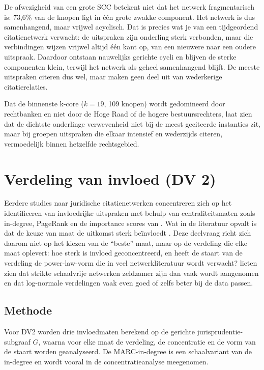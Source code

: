 \documentclass[a4paper, 12pt]{report}
\begin{document}
De afwezigheid van een grote SCC betekent niet dat het netwerk fragmentarisch is: 73,6\% van de knopen ligt in één grote zwakke component. Het netwerk is dus samenhangend, maar vrijwel acyclisch. Dat is precies wat je van een tijdgeordend citatienetwerk verwacht: de uitspraken zijn onderling sterk verbonden, maar die verbindingen wijzen vrijwel altijd één kant op, van een nieuwere naar een oudere uitspraak. Daardoor ontstaan nauwelijks gerichte cycli en blijven de sterke componenten klein, terwijl het netwerk als geheel samenhangend blijft. De meeste uitspraken citeren dus wel, maar maken geen deel uit van wederkerige citatierelaties.

Dat de binnenste k-core ($k = 19$, 109 knopen) wordt gedomineerd door rechtbanken en niet door de Hoge Raad of de hogere bestuursrechters, laat zien dat de dichtste onderlinge verwevenheid niet bij de meest geciteerde instanties zit, maar bij groepen uitspraken die elkaar intensief en wederzijds citeren, vermoedelijk binnen hetzelfde rechtsgebied.


\chapter{Verdeling van invloed (DV 2)}
\label{ch:dv2}

Eerdere studies naar juridische citatienetwerken concentreren zich op het identificeren van invloedrijke uitspraken met behulp van centraliteitsmaten zoals in-degree, PageRank \parencite{brin1998, winkels2012} en de importance scores van \textcite{fowler2007}. Wat in de literatuur opvalt is dat de keuze van maat de uitkomst sterk be\"invloedt \parencite{fowler2008, vanopijnen2012}. Deze deelvraag richt zich daarom niet op het kiezen van de ``beste'' maat, maar op de verdeling die elke maat oplevert: hoe sterk is invloed geconcentreerd, en heeft de staart van de verdeling de power-law-vorm die in veel netwerkliteratuur wordt verwacht? \textcite{broido2019} lieten zien dat strikte schaalvrije netwerken zeldzamer zijn dan vaak wordt aangenomen en dat log-normale verdelingen vaak even goed of zelfs beter bij de data passen.


\section{Methode}

Voor DV2 worden drie invloedmaten berekend op de gerichte jurisprudentie-subgraaf $G$, waarna voor elke maat de verdeling, de concentratie en de vorm van de staart worden geanalyseerd. De MARC-in-degree is een schaalvariant van de in-degree en wordt vooral in de concentratieanalyse meegenomen.
\end{document}
